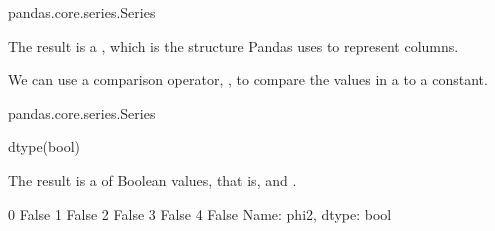 \documentclass[letterpaper,10pt,english]{sphinxmanual}
\begin{document}
\begin{sphinxVerbatim}[commandchars=\\\{\}]
pandas.core.series.Series
\end{sphinxVerbatim}

The result is a , which is the structure Pandas uses to represent columns.

We can use a comparison operator, \sphinxcode{\sphinxupquote{\textgreater{}}}, to compare the values in a  to a constant.

\begin{sphinxVerbatim}[commandchars=\\\{\}]
    
    

  \PYG{p}{[}\PYG{p}{]}  
\end{sphinxVerbatim}

\begin{sphinxVerbatim}[commandchars=\\\{\}]
pandas.core.series.Series
\end{sphinxVerbatim}

\begin{sphinxVerbatim}[commandchars=\\\{\}]
\end{sphinxVerbatim}

\begin{sphinxVerbatim}[commandchars=\\\{\}]
dtype(\PYGZsq{}bool\PYGZsq{})
\end{sphinxVerbatim}

The result is a  of Boolean values, that is,  and .

\begin{sphinxVerbatim}[commandchars=\\\{\}]
\end{sphinxVerbatim}

\begin{sphinxVerbatim}[commandchars=\\\{\}]
0    False
1    False
2    False
3    False
4    False
Name: phi2, dtype: bool
\end{sphinxVerbatim}
\end{document}
